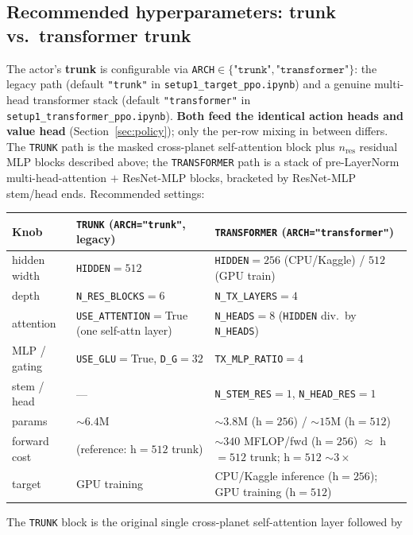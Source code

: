 \documentclass[11pt]{article}
\begin{document}
\subsection{Recommended hyperparameters: trunk vs.\ transformer trunk}\label{sec:trunkcfg}
The actor's \textbf{trunk} is configurable via \texttt{ARCH}$\in\{\texttt{"trunk"},\texttt{"transformer"}\}$:
the legacy path (default \texttt{"trunk"} in \texttt{setup1\_target\_ppo.ipynb}) and a genuine
multi-head transformer stack (default \texttt{"transformer"} in
\texttt{setup1\_transformer\_ppo.ipynb}). \textbf{Both feed the identical action heads and value head}
(Section~\ref{sec:policy}); only the per-row mixing in between differs. The \texttt{TRUNK} path is the
masked cross-planet self-attention block plus $n_{\mathrm{res}}$ residual MLP blocks described above;
the \texttt{TRANSFORMER} path is a stack of pre-LayerNorm multi-head-attention $+$ ResNet-MLP blocks,
bracketed by ResNet-MLP stem/head ends. Recommended settings:
\begin{center}\small
\begin{tabular}{@{}lll@{}}
\toprule
Knob & \texttt{TRUNK} (\texttt{ARCH="trunk"}, legacy) & \texttt{TRANSFORMER} (\texttt{ARCH="transformer"}) \\
\midrule
hidden width & \texttt{HIDDEN}$=512$ & \texttt{HIDDEN}$=256$ (CPU/Kaggle) / $512$ (GPU train) \\
depth        & \texttt{N\_RES\_BLOCKS}$=6$ & \texttt{N\_TX\_LAYERS}$=4$ \\
attention    & \texttt{USE\_ATTENTION}$=$True (one self-attn layer) & \texttt{N\_HEADS}$=8$ (\texttt{HIDDEN} div.\ by \texttt{N\_HEADS}) \\
MLP / gating & \texttt{USE\_GLU}$=$True, \texttt{D\_G}$=32$ & \texttt{TX\_MLP\_RATIO}$=4$ \\
stem / head  & --- & \texttt{N\_STEM\_RES}$=1$, \texttt{N\_HEAD\_RES}$=1$ \\
\midrule
params       & ${\sim}6.4$M & ${\sim}3.8$M (h$=256$) / ${\sim}15$M (h$=512$) \\
forward cost & (reference: h$=512$ trunk) & ${\sim}340$ MFLOP/fwd (h$=256$) $\approx$ h$=512$ trunk; h$=512$ ${\sim}3\times$ \\
target       & GPU training & CPU/Kaggle inference (h$=256$); GPU training (h$=512$) \\
\bottomrule
\end{tabular}
\end{center}
\noindent The \texttt{TRUNK} block is the original single cross-planet self-attention layer followed by
\end{document}
